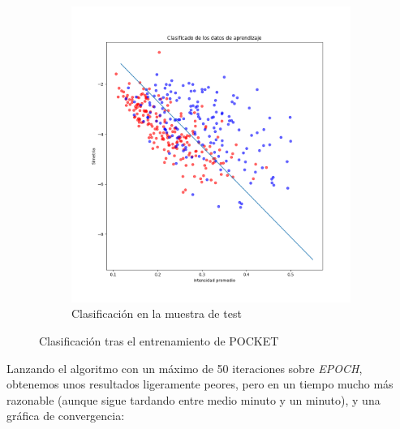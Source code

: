 \documentclass[11pt]{article}
\begin{document}
\begin{figure}[H]
\begin{subfigure}{0.3\textwidth}
        \includegraphics[scale=0.35]{clasificacion_pocket_test}
        \caption{Clasificación en la muestra de test}
    \end{subfigure}
    \caption{Clasificación tras el entrenamiento de POCKET}
\end{figure}

Lanzando el algoritmo con un máximo de 50 iteraciones sobre \emph{EPOCH}, obtenemos unos resultados ligeramente peores, pero en un tiempo mucho más razonable (aunque sigue tardando entre medio minuto y un minuto), y una gráfica de convergencia:
\end{document}
